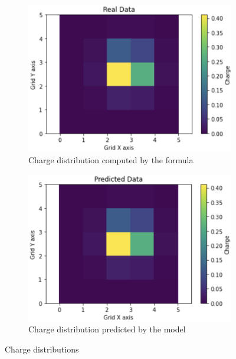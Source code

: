 \documentclass[final]{beamer}
\newlength{\colwidth}
\begin{document}
\begin{frame}[t]
\begin{columns}[t]
\begin{column}{\colwidth}
    \begin{figure}[H]
    \centering
    \begin{subfigure}{.5\textwidth}
      \centering
      \includegraphics[width=1\linewidth]{images/real.png}
      \caption{Charge distribution computed by the formula}
      \label{fig:sub1}
    \end{subfigure}%
    \begin{subfigure}{.5\textwidth}
      \centering
      \includegraphics[width=1\linewidth]{images/predicted.png}
      \caption{Charge distribution predicted by the model}
      \label{fig:sub2}
    \end{subfigure}
    \caption{Charge distributions}
    \label{fig:model}
    \end{figure}


\end{column}
\end{columns}
\end{frame}
\end{document}
